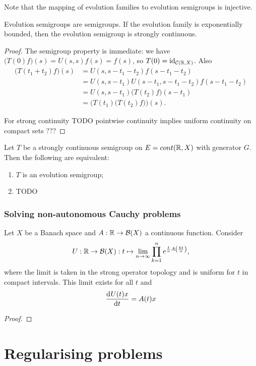 Note that the mapping of evolution families to evolution semigroups is injective.

\begin{lemma}
Evolution semigroups are semigroups. If the evolution family is exponentially bounded, then the evolution semigroup is strongly continuous.
\end{lemma}
\begin{proof}
The semigroup property is immediate: we have $\big(T(0)f\big)(s) = U(s,s)f(s) = f(s)$, so $T(0) = \operatorname{id}_{\operatorname{\mathcal{C}}(\mathbb{R},X)}$. Also
\begin{align*}
\big(T(t_1+t_2)f\big)(s) &= U(s,s-t_1-t_2)f(s-t_1-t_2) \\
&= U(s,s-t_1)U(s-t_1,s-t_1-t_2)f(s-t_1-t_2) \\
&= U(s,s-t_1)\big(T(t_2)f\big)(s-t_1) \\
&= \Big(T(t_1)\big(T(t_2)f\big)\Big)(s).
\end{align*}


For strong continuity TODO pointwise continuity implies uniform continuity on compact sets ???
\end{proof}

\begin{proposition}
Let $T$ be a strongly continuous semigroup on $E = cont(\mathbb{R},X)$ with generator $G$. Then the following are equivalent:
\begin{enumerate}
\item $T$ is an evolution semigroup;
\item TODO
\end{enumerate}
\end{proposition}

\subsubsection{Solving non-autonomous Cauchy problems}
\begin{proposition}
Let $X$ be a Banach space and $A: \mathbb{R}\to \operatorname{\mathcal{B}}(X)$ a continuous function. Consider
\[ U: \mathbb{R}\to \operatorname{\mathcal{B}}(X): t\mapsto \lim_{n\to\infty}\prod_{k=1}^ne^{\frac{t}{n}A\left(\frac{kt}{n}\right)}, \]
where the limit is taken in the strong operator topology and is uniform for $t$ in compact intervals. This limit exists for all $t$ and
\[ \mathinner{ \dfrac{\operatorname{d \!}{^{}}U(t)x}{\operatorname{d \!}{{t}^{}}} } = A(t)x \]
\end{proposition}
\begin{proof}

\end{proof}


\section{Regularising problems}
